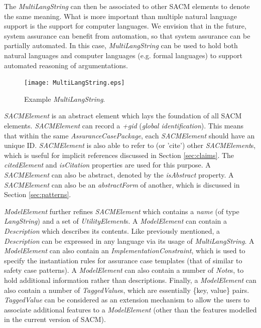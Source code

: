 The \textit{MultiLangString} can then be associated to other SACM elements to denote the same meaning. What is more important than multiple natural language support is the support for computer languages. We envision that in the future, system assurance can benefit from automation, so that system assurance can be partially automated. In this case, \textit{MultiLangString} can be used to hold both natural languages and computer languages (e.g. formal languages) to support automated reasoning of argumentations. 

\begin{figure}
	\centering
	\texttt{[image: MultiLangString.eps]}
	\caption{Example \textit{MultiLangString}.}
	\label{fig:mulitiLang}
\end{figure}

\textit{SACMElement} is an abstract element which lays the foundation of all SACM elements. \textit{SACMElement} can record a \textit{+gid} (\textit{global identification}). 
This means that within the same \textit{AssuranceCasePackage}, each \textit{SACMElement} should have an unique ID. 
\textit{SACMElement} is also able to refer to (or 'cite') other \textit{SACMElement}s, which is useful for implicit references discussed in Section \ref{sec:claims}. The \textit{citedElement} and \textit{isCitation} properties are used for this purpose. A \textit{SACMElement} can also be abstract, denoted by the \textit{isAbstract} property. A \textit{SACMElement} can also be an \textit{abstractForm} of another, which is discussed in Section \ref{sec:patterns}. 

\textit{ModelElement} further refines \textit{SACMElement} which contains a \textit{name} (of type \textit{LangString}) and a set of \textit{UtilityElement}s. A \textit{ModelElement} can contain a \textit{Description} which describes its contents. Like previously mentioned, a \textit{Description} can be expressed in any language via its usage of \textit{MultiLangString}. A \textit{ModelElement} can also contain an \textit{ImplementationConstraint}, which is used to specify the instantiation rules for assurance case templates (that of similar to safety case patterns).
A \textit{ModelElement} can also contain a number of \textit{Note}s, to hold additional information rather than descriptions. Finally, a \textit{ModelElement} can also contain a number of \textit{TaggedValue}s, which are essentially \{key, value\} pairs. \textit{TaggedValue} can be considered as an extension mechanism to allow the users to associate additional features to a \textit{ModelElement} (other than the features modelled in the current version of SACM).


